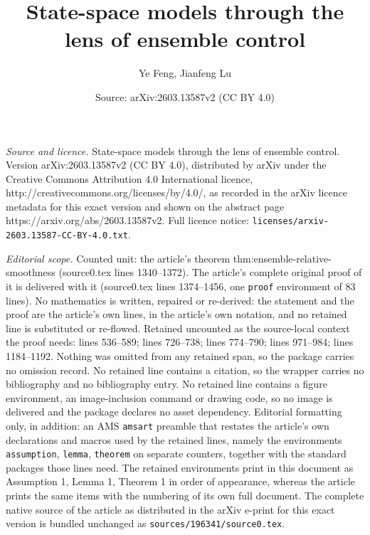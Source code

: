 \documentclass[10pt,a4paper]{amsart}
\title{State-space models through the lens of ensemble control}
\author{Ye Feng, Jianfeng Lu}
\date{Source: arXiv:2603.13587v2 (CC BY 4.0)}
\begin{document}
\maketitle

\noindent\emph{Source and licence.} State-space models through the lens of ensemble control. Version arXiv:2603.13587v2 (CC BY 4.0), distributed by arXiv under the Creative Commons Attribution 4.0 International licence, http://creativecommons.org/licenses/by/4.0/, as recorded in the arXiv licence metadata for this exact version and shown on the abstract page https://arxiv.org/abs/2603.13587v2. Full licence notice: \texttt{licenses/arxiv-2603.13587-CC-BY-4.0.txt}.\par\smallskip

\noindent\textit{Editorial scope.} Counted unit: the article's theorem thm:ensemble-relative-smoothness (source0.tex lines 1340--1372). The article's complete original proof of it is delivered with it (source0.tex lines 1374--1456, one \texttt{proof} environment of 83 lines). No mathematics is written, repaired or re-derived: the statement and the proof are the article's own lines, in the article's own notation, and no retained line is substituted or re-flowed.  Retained uncounted as the source-local context the proof needs: lines 536--589; lines 726--738; lines 774--790; lines 971--984; lines 1184--1192.  Nothing was omitted from any retained span, so the package carries no omission record.  No retained line contains a citation, so the wrapper carries no bibliography and no bibliography entry.  No retained line contains a figure environment, an image-inclusion command or drawing code, so no image is delivered and the package declares no asset dependency.  Editorial formatting only, in addition: an AMS \texttt{amsart} preamble that restates the article's own declarations and macros used by the retained lines, namely the environments \texttt{assumption}, \texttt{lemma}, \texttt{theorem} on separate counters, together with the standard packages those lines need.  The retained environments print in this document as Assumption 1, Lemma 1, Theorem 1 in order of appearance, whereas the article prints the same items with the numbering of its own full document.  The complete native source of the article as distributed in the arXiv e-print for this exact version is bundled unchanged as \texttt{sources/196341/source0.tex}.
\end{document}
